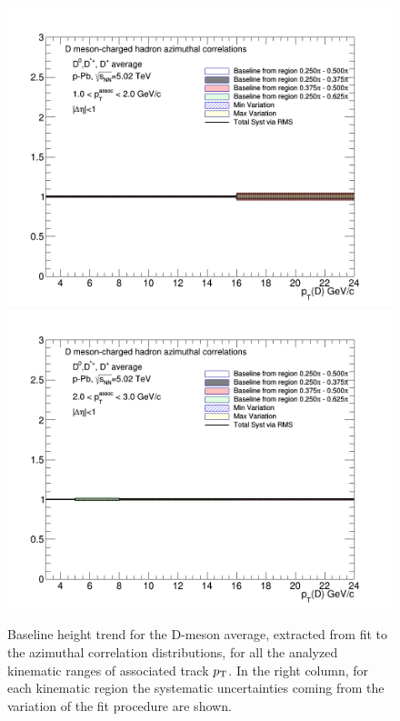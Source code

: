 \begin{figure}[!htbp]
{\includegraphics[width=0.49\linewidth, height=0.33\linewidth]{figures/FitOutput/BaselineSystematicSourcesPedestal_pthad1dotto2dot.png}}
{\includegraphics[width=0.49\linewidth, height=0.33\linewidth]{figures/FitOutput/BaselineSystematicSourcesPedestal_pthad2dotto3dot.png}}
\caption{Baseline height trend for the D-meson average, extracted from fit to the azimuthal correlation distributions, for all the analyzed kinematic ranges of associated track $p_{\rm T}$. In the right column, for each kinematic region the systematic uncertainties coming from the variation of the fit procedure are shown.}
\label{fig:baselineAverage}
\end{figure}

